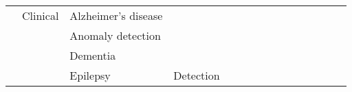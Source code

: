\begin{tabular}{p{1.5cm}p{1.5cm}p{1.5cm}p{1.5cm}p{0.6cm}p{0.6cm}p{0.6cm}p{0.6cm}p{0.6cm}p{0.6cm}p{0.6cm}p{0.6cm}p{0.6cm}p{0.6cm}p{0.6cm}}
                                & Clinical & Alzheimer's disease &   &                                                             &                                                                                                         \cite{Morabito2016} &                                                                        &                                      &                                                            &                      &                         &                               &                     &                         &                                                                      \\
                                &                 & Anomaly detection &   &                                                             &                                                                                                                             &                                                                        &                    \cite{Wulsin2011} &                                                            &                      &                         &                               &                     &                         &                                                                      \\
                                &                 & Dementia &   &                                         \cite{Morabito2017} &                                                                                                                             &                                                                        &                                      &                                                            &                      &                         &                               &                     &                         &                                                                      \\
                                &                 & Epilepsy & Detection &                          \cite{Yuan2018a, Golmohammadi2017} &                                         \cite{Yan2018, Hao2018, Ullah2018, Shea2018, Oshea2017, Acharya2017, Thodoroff2016} &  \cite{VanPutten2018a, Golmohammadi2017b, Shah2017, Golmohammadi2017a} &                    \cite{Turner2014} &                          \cite{Pramod2015, Omerhodzic2013} &                      &                         &               \cite{Taqi2017} &                     &                         &  \cite{Hussein2018, Ahmedt-Aristizabal2018, Talathi2017, Naderi2010} \\

\end{tabular}
